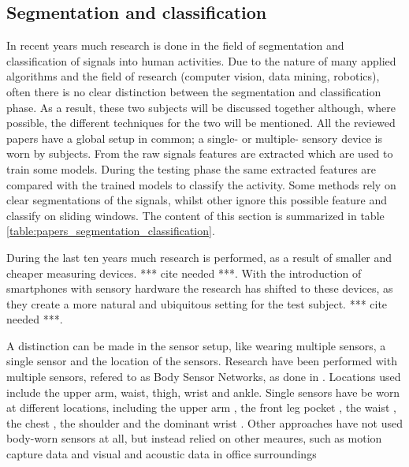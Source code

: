 \subsection{Segmentation and classification}\label{sec:lit_review_segmentation}
In recent years much research is done in the field of segmentation and classification of signals into human activities.
Due to the nature of many applied algorithms and the field of research (computer vision, data mining, robotics), often there is no clear distinction between the segmentation and classification phase.
As a result, these two subjects will be discussed together although, where possible, the different techniques for the two will be mentioned.
All the reviewed papers have a global setup in common; a single- or multiple- sensory device is worn by subjects.
From the raw signals features are extracted which are used to train some models.
During the testing phase the same extracted features are compared with the trained models to classify the activity.
Some methods rely on clear segmentations of the signals, whilst other ignore this possible feature and classify on sliding windows.
The content of this section is summarized in table \ref{table:papers_segmentation_classification}.

During the last ten years much research is performed, as a result of smaller and cheaper measuring devices. *** cite needed ***.
With the introduction of smartphones with sensory hardware the research has shifted to these devices, as they create a more natural and ubiquitous setting for the test subject. *** cite needed ***.

A distinction can be made in the sensor setup, like wearing multiple sensors, a single sensor and the location of the sensors.
Research have been performed with multiple sensors, refered to as Body Sensor Networks, as done in \cite{guenterberg2009automatic, guenterberg2009distributed, bao2004activity, sherril2005using}.
Locations used include the upper arm, waist, thigh, wrist and ankle.
Single sensors have be worn at different locations, including the upper arm \cite{krause2003unsupervised}, the front leg pocket \cite{kwapisz2011activity, duque2012offline, siirtola2012recognizing, he2009activity}, the waist \cite{ravi2005activity, lester2006practical, lee2178physical}, the chest \cite{ahmed2012non, himberg2001time}, the shoulder \cite{lester2005hybrid} and the dominant wrist \cite{yang2008using, long2009single}.
Other approaches have not used body-worn sensors at all, but instead relied on other meaures, such as motion capture data \cite{barbivc2004segmenting, zhou2008aligned} and visual \cite{perdikis2008recognition} and acoustic data in office surroundings \cite{oliver2002layered}


